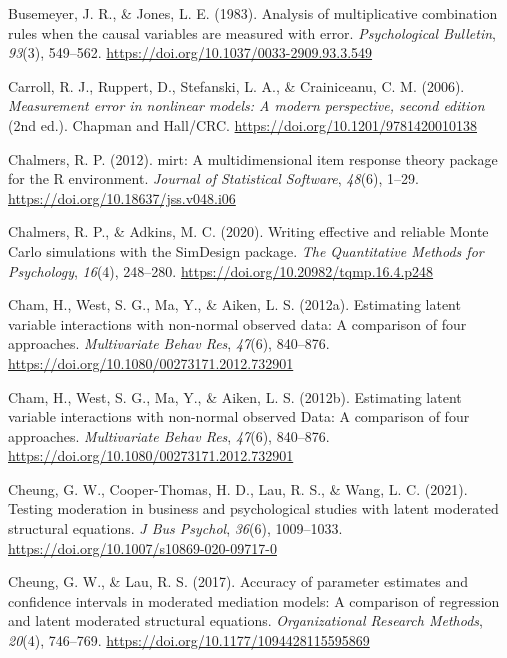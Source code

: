 \documentclass[
  11pt,
  man]{apa6}
\newlength{\cslhangindent}
\newlength{\cslentryspacingunit} %
\newenvironment{CSLReferences}[2] %
 {%
  \setlength{\parindent}{0pt}
  \ifodd #1
  \let\oldpar\par
  \def\par{\hangindent=\cslhangindent\oldpar}
  \fi
  \setlength{\parskip}{#2\cslentryspacingunit}
 }%
 {}
\begin{document}
\begin{CSLReferences}{1}{0}
\leavevmode{}%
Busemeyer, J. R., \& Jones, L. E. (1983). Analysis of multiplicative combination rules when the causal variables are measured with error. \emph{Psychological Bulletin}, \emph{93}(3), 549--562. \url{https://doi.org/10.1037/0033-2909.93.3.549}

\leavevmode{}%
Carroll, R. J., Ruppert, D., Stefanski, L. A., \& Crainiceanu, C. M. (2006). \emph{Measurement error in nonlinear models: {A} modern perspective, second edition} (2nd ed.). {Chapman and Hall/CRC}. \url{https://doi.org/10.1201/9781420010138}

\leavevmode{}%
Chalmers, R. P. (2012). {mirt}: A multidimensional item response theory package for the {R} environment. \emph{Journal of Statistical Software}, \emph{48}(6), 1--29. \url{https://doi.org/10.18637/jss.v048.i06}

\leavevmode{}%
Chalmers, R. P., \& Adkins, M. C. (2020). Writing effective and reliable {Monte Carlo} simulations with the {SimDesign} package. \emph{The Quantitative Methods for Psychology}, \emph{16}(4), 248--280. \url{https://doi.org/10.20982/tqmp.16.4.p248}

\leavevmode{}%
Cham, H., West, S. G., Ma, Y., \& Aiken, L. S. (2012a). Estimating latent variable interactions with non-normal observed data: {A} comparison of four approaches. \emph{Multivariate Behav Res}, \emph{47}(6), 840--876. \url{https://doi.org/10.1080/00273171.2012.732901}

\leavevmode{}%
Cham, H., West, S. G., Ma, Y., \& Aiken, L. S. (2012b). Estimating {latent variable interactions with non-normal observed Data}: {A comparison} of {four approaches}. \emph{Multivariate Behav Res}, \emph{47}(6), 840--876. \url{https://doi.org/10.1080/00273171.2012.732901}

\leavevmode{}%
Cheung, G. W., Cooper-Thomas, H. D., Lau, R. S., \& Wang, L. C. (2021). Testing {moderation} in {business} and {psychological studies} with {latent moderated structural equations}. \emph{J Bus Psychol}, \emph{36}(6), 1009--1033. \url{https://doi.org/10.1007/s10869-020-09717-0}

\leavevmode{}%
Cheung, G. W., \& Lau, R. S. (2017). Accuracy of {parameter estimates} and {confidence intervals} in {moderated mediation models}: {A comparison} of {regression} and {latent moderated structural equations}. \emph{Organizational Research Methods}, \emph{20}(4), 746--769. \url{https://doi.org/10.1177/1094428115595869}


\end{CSLReferences}
\end{document}
